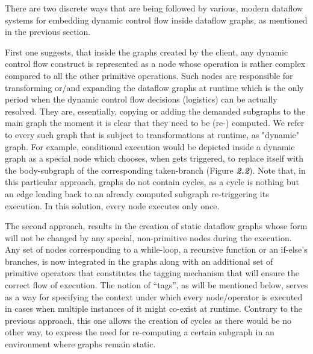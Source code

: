 \documentclass[ack,preface]{dithesis}
\begin{document}
There are two discrete ways that are being followed by various, modern dataflow systems for embedding dynamic control flow inside dataflow graphs, as mentioned in the previous section. 

First one suggests, that inside the graphs created by the client, any dynamic control flow construct is represented as a node whose operation is rather complex compared to all the other primitive operations. Such nodes are responsible for transforming or/and expanding the dataflow graphs at runtime which is the only period when the dynamic control flow decisions (logistics) can be actually resolved. They are, essentially, copying or adding the demanded subgraphs to the main graph the moment it is clear that they need to be (re-) computed. We refer to every such graph that is subject to transformations at runtime, as "dynamic" graph.  For example, conditional execution would be depicted inside a dynamic graph as a special node which chooses, when gets triggered, to replace itself with the body-subgraph of the corresponding taken-branch (Figure \textit{\textbf{2.2}}).
Note that, in this particular approach, graphs do not contain cycles, as a cycle is nothing but an edge leading back to an already computed subgraph re-triggering its execution. In this solution, every node executes only once. 

The second approach, results in the creation of static dataflow graphs whose form will not be changed by any special, non-primitive nodes during the execution. Any set of nodes corresponding to a while-loop, a recursive function or an if-else’s branches, is now integrated in the graphs along with an additional set of primitive operators that constitutes the tagging mechanism that will ensure the correct flow of execution. The notion of “tags”, as will be mentioned below, serves as a way for specifying the context under which every node/operator is executed in cases when multiple instances of it might co-exist at runtime. Contrary to the previous approach, this one allows the creation of cycles as there would be no other way, to express the need for re-computing a certain subgraph in an environment where graphs remain static. 
\end{document}

